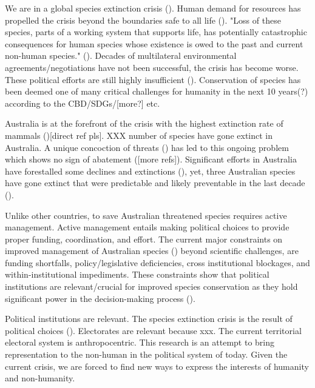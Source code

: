 \documentclass[a4paper,11pt]{article}
\begin{document}
We are in a global species extinction crisis (\cite{ceballosAcceleratedModernHuman2015,lewisDefiningAnthropocene2015,laybournlangton2019,IPBES2019[TODO]}). Human demand for resources has propelled the crisis beyond the boundaries safe to all life (\cite{maxwellBiodiversityRavagesGuns2016, sternerPolicyDesignAnthropocene2019}). "Loss of these species, parts of a working system that supports life, has potentially catastrophic consequences for human species whose existence is owed to the past and current non-human species." (\cite{burkeSpeciesBordersPolitical2020}). Decades of multilateral environmental agreements/negotiations have not been successful, the crisis has become worse. These political efforts are still highly insufficient (\cite{rockstrom2009[TODO]}). Conservation of species has been deemed one of many critical challenges for humanity in the next 10 years(?) according to the CBD/SDGs/[more?] etc.

Australia is at the forefront of the crisis with the highest extinction rate of mammals (\cite{simmondsVulnerableSpeciesEcosystems2020})[direct ref pls]. XXX number of species have gone extinct in Australia. A unique concoction of threats (\cite{kearneyThreatsAustraliaImperilled2019}) has led to this ongoing problem which shows no sign of abatement (\cite{simmondsVul,nerableSpeciesEcosystems2020}[more refs]). Significant efforts in Australia have forestalled some declines and extinctions (\cite{kearneyThreatsAustraliaImperilled2019}), yet, three Australian species have gone extinct that were predictable and likely preventable in the last decade (\cite{woinarskiContributionPolicyLaw2017}).

Unlike other countries, to save Australian threatened species requires active management. Active management entails making political choices to provide proper funding, coordination, and effort. The current major constraints on improved management of Australian species (\cite{leggeMonitoringThreatenedSpecies2018,wintleSpendingWhatWill2019, wawardLotsLossLittle2019, simmondsVulnerableSpeciesEcosystems2020, kearney et al, woinarski et al}) beyond scientific challenges, are funding shortfalls, policy/legislative deficiencies, cross institutional blockages, and within-institutional impediments. These constraints show that political institutions are relevant/crucial for improved species conservation as they hold significant power in the decision-making process (\cite{rydenLinkingDemocracyBiodiversity2020}).

Political institutions are relevant. The species extinction crisis is the result of political choices (\cite{Dalby2017[TODO]}). Electorates are relevant because xxx. The current territorial electoral system is anthropocentric. 
This research is an attempt to bring representation to the non-human in the political system of today. Given the current crisis, we are forced to find new ways to express the interests of humanity and non-humanity.
\end{document}
